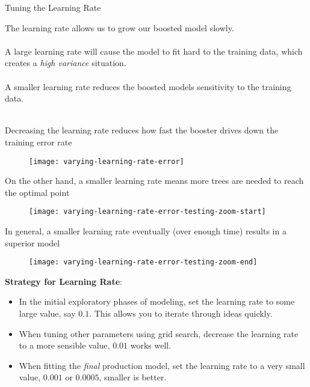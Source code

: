 %
\begin{frame}{Tuning the Learning Rate}

The learning rate allows us to grow our boosted model slowly.\\~\\

A large learning rate will cause the model to fit hard to the training data, which creates a \textit{high variance} situation.\\~\\

A smaller learning rate reduces the boosted models sensitivity to the training data.\\~\\

\end{frame}
%
\begin{frame}
Decreasing the learning rate reduces how fast the booster drives down the training error rate
  \begin{figure}
    \texttt{[image: varying-learning-rate-error]}
  \end{figure}
  
\end{frame}
%
\begin{frame}
On the other hand, a smaller learning rate means more trees are needed to reach the optimal point

  \begin{figure}
    \texttt{[image: varying-learning-rate-error-testing-zoom-start]}
  \end{figure}
  
\end{frame}
%
\begin{frame}
In general, a smaller learning rate eventually (over enough time) results in a superior model

  \begin{figure}
    \texttt{[image: varying-learning-rate-error-testing-zoom-end]}
  \end{figure}
  
\end{frame}
%
\begin{frame}
\textbf{Strategy for Learning Rate}:

\begin{itemize}
  \item In the initial exploratory phases of modeling, set the learning rate to some large value, say $0.1$.  This allows you to iterate through ideas quickly.
  \item When tuning other parameters using grid search, decrease the learning rate to a more sensible value, $0.01$ works well.
  \item When fitting the \textit{final} production model, set the learning rate to a very small value, $0.001$ or $0.0005$, smaller is better.
\end{itemize}

\end{frame}
